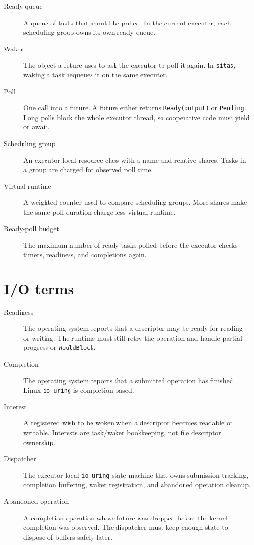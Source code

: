 \begin{description}
    \item[Ready queue] A queue of tasks that should be polled. In the current
        executor, each scheduling group owns its own ready queue.

    \item[Waker] The object a future uses to ask the executor to poll it again.
        In \texttt{sitas}, waking a task requeues it on the same executor.

    \item[Poll] One call into a future. A future either returns
        \texttt{Ready(output)} or \texttt{Pending}. Long polls block the whole
        executor thread, so cooperative code must yield or await.

    \item[Scheduling group] An executor-local resource class with a name and
        relative shares. Tasks in a group are charged for observed poll time.

    \item[Virtual runtime] A weighted counter used to compare scheduling
        groups. More shares make the same poll duration charge less virtual
        runtime.

    \item[Ready-poll budget] The maximum number of ready tasks polled before
        the executor checks timers, readiness, and completions again.
\end{description}

\section{I/O terms}

\begin{description}
    \item[Readiness] The operating system reports that a descriptor may be
        ready for reading or writing. The runtime must still retry the
        operation and handle partial progress or \texttt{WouldBlock}.

    \item[Completion] The operating system reports that a submitted operation
        has finished. Linux \texttt{io\_uring} is completion-based.

    \item[Interest] A registered wish to be woken when a descriptor becomes
        readable or writable. Interests are task/waker bookkeeping, not file
        descriptor ownership.

    \item[Dispatcher] The executor-local \texttt{io\_uring} state machine that
        owns submission tracking, completion buffering, waker registration, and
        abandoned operation cleanup.

    \item[Abandoned operation] A completion operation whose future was dropped
        before the kernel completion was observed. The dispatcher must keep
        enough state to dispose of buffers safely later.
\end{description}

